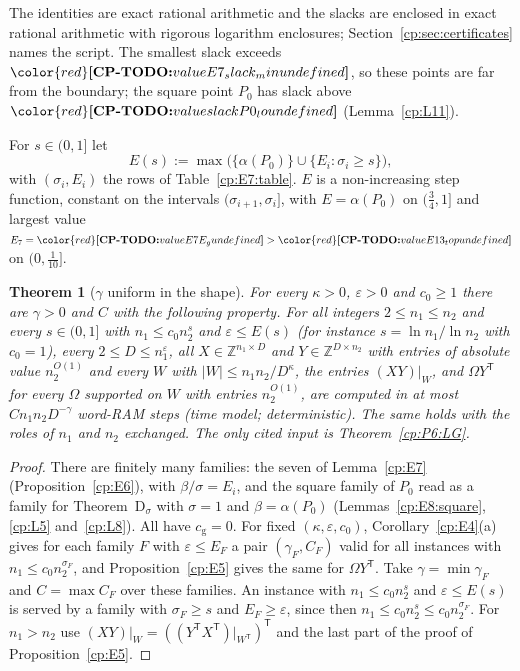 \documentclass[11pt]{article}
\makeatletter
\newtheorem{theorem}{Theorem}[section]
\theoremstyle{definition}
\theoremstyle{remark}
\DeclareRobustCommand{\CPTODO}[1]{{\color{red}\textbf{[CP-TODO:} #1\textbf{]}}}
\providecommand{\eps}{\varepsilon}
\providecommand{\Z}{\mathbb{Z}}
\newcommand{\abs}[1]{\lvert #1\rvert}
\newcommand{\cg}{c_{\mathrm g}}               %
\newcommand{\ThmDsig}{Theorem~D\texorpdfstring{\ensuremath{_\sigma}}{\_sigma}}   %
\newcommand{\Pzero}{P_0}                      %
\newcommand{\cpv}[1]{\ifcsname cpv@#1\endcsname\csname cpv@#1\endcsname\else\CPTODO{value #1 undefined}\fi}
\makeatother
\begin{document}
The identities are exact rational arithmetic and the slacks are enclosed in exact rational arithmetic with rigorous logarithm enclosures; Section~\ref{cp:sec:certificates} names the script. The smallest slack exceeds $\cpv{E7_slack_min}$, so these points are far from the boundary; the square point $\Pzero$ has slack above $\cpv{slackP0_lo}$ (Lemma~\ref{cp:L11}).

For $s\in(0,1]$ let
\[
E(s):=\max\bigl(\{\alpha(\Pzero)\}\cup\{E_i:\sigma_i\ge s\}\bigr),
\]
with $(\sigma_i,E_i)$ the rows of Table~\ref{cp:E7:table}. $E$ is a non-increasing step function, constant on the intervals $(\sigma_{i+1},\sigma_i]$, with $E=\alpha(\Pzero)$ on $(\frac34,1]$ and largest value $E_7=\cpv{E7E_g}>\cpv{E13_top}$ on $(0,\frac1{10}]$.

\begin{theorem}[$\gamma$ uniform in the shape]\label{cp:E8}
For every $\kappa>0$, $\eps>0$ and $c_0\ge1$ there are $\gamma>0$ and $C$ with the following property. For all integers $2\le n_1\le n_2$ and every $s\in(0,1]$ with $n_1\le c_0n_2^s$ and $\eps\le E(s)$ (for instance $s=\ln n_1/\ln n_2$ with $c_0=1$), every $2\le D\le n_1^\eps$, all $X\in\Z^{n_1\times D}$ and $Y\in\Z^{D\times n_2}$ with entries of absolute value $n_2^{O(1)}$ and every $W$ with $\abs W\le n_1n_2/D^\kappa$, the entries $(XY)|_W$, and $\Omega Y^{\mathsf T}$ for every $\Omega$ supported on $W$ with entries $n_2^{O(1)}$, are computed in at most $Cn_1n_2D^{-\gamma}$ word-RAM steps (time model; deterministic). The same holds with the roles of $n_1$ and $n_2$ exchanged. The only cited input is Theorem~\ref{cp:P6:LG}.
\end{theorem}

\begin{proof}
There are finitely many families: the seven of Lemma~\ref{cp:E7} (Proposition~\ref{cp:E6}), with $\beta/\sigma=E_i$, and the square family of $\Pzero$ read as a family for \ThmDsig{} with $\sigma=1$ and $\beta=\alpha(\Pzero)$ (Lemmas~\ref{cp:E8:square}, \ref{cp:L5} and~\ref{cp:L8}). All have $\cg=0$. For fixed $(\kappa,\eps,c_0)$, Corollary~\ref{cp:E4}(a) gives for each family $F$ with $\eps\le E_F$ a pair $(\gamma_F,C_F)$ valid for all instances with $n_1\le c_0n_2^{\sigma_F}$, and Proposition~\ref{cp:E5} gives the same for $\Omega Y^{\mathsf T}$. Take $\gamma=\min\gamma_F$ and $C=\max C_F$ over these families. An instance with $n_1\le c_0n_2^s$ and $\eps\le E(s)$ is served by a family with $\sigma_F\ge s$ and $E_F\ge\eps$, since then $n_1\le c_0n_2^s\le c_0n_2^{\sigma_F}$. For $n_1>n_2$ use $(XY)|_W=((Y^{\mathsf T}X^{\mathsf T})|_{W^{\mathsf T}})^{\mathsf T}$ and the last part of the proof of Proposition~\ref{cp:E5}.
\end{proof}
\end{document}
